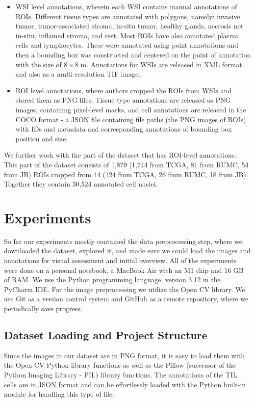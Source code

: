 \begin{itemize}
    \item WSI level annotations, wherein each WSI contains manual annotations of ROIs. Different tissue types are annotated with polygons, namely: invasive tumor, tumor-associated stroma, in-situ tumor, healthy glands, necrosis not in-situ, inflamed stroma, and rest. Most ROIs have also annotated plasma cells and lymphocytes. These were annotated using point annotations and then a bounding box was constructed and centered on the point of annotation with the size of $8\!\times\!8$ \textmu m. Annotations for WSIs are released in XML format and also as a multi-resolution TIF image.
    \item ROI level annotations, where authors cropped the ROIs from WSIs and stored them as PNG files. Tissue type annotations are released as PNG images, containing pixel-level masks, and cell annotations are released in the COCO format - a JSON file containing file paths (the PNG images of ROIs) with IDs and metadata and corresponding annotations of bounding box position and size.
\end{itemize}

We further work with the part of the dataset that has ROI-level annotations. This part of the dataset consists of 1,879 (1,744 from TCGA, 81 from RUMC, 54 from JB) ROIs cropped from 44 (124 from TCGA, 26 from RUMC, 18 from JB). Together they contain 30,524 annotated cell nuclei.

\section{Experiments}
So far our experiments mostly contained the data preprocessing step, where we downloaded the dataset, explored it, and made sure we could load the images and annotations for visual assessment and initial overview. All of the experiments were done on a personal notebook, a MacBook Air with an M1 chip and 16 GB of RAM. We use the Python programming language, version 3.12 in the PyCharm IDE. For the image preprocessing we utilize the Open CV library. We use Git as a version control system and GitHub as a remote repository, where we periodically save progress.

\subsection{Dataset Loading and Project Structure}
Since the images in our dataset are in PNG format, it is easy to load them with the Open CV Python library functions as well as the Pillow (successor of the Python Imaging Library - PIL) library functions. The annotations of the TIL cells are in JSON format and can be effortlessly loaded with the Python built-in module for handling this type of file.

